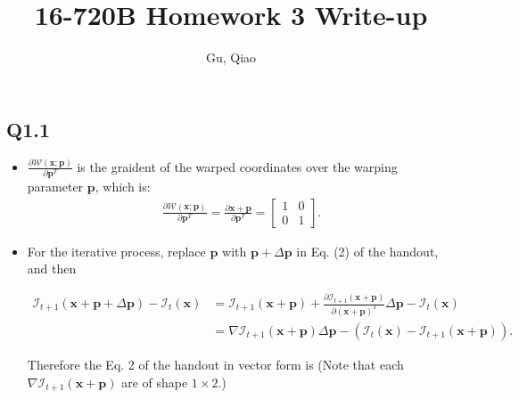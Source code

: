 \documentclass[11pt]{article}
\begin{document}
\author{Gu, Qiao}
\title{16-720B Homework 3 Write-up}
\maketitle

\medskip

\subsection*{Q1.1}

\newcommand{\W} {\mathcal{W}}
\newcommand{\I} {\mathcal{I}}
\newcommand{\B} {\mathcal{B}}
\newcommand{\w} {\mathbf{w}}
\newcommand{\x} {\mathbf{x}}
\newcommand{\p} {\mathbf{p}}
\newcommand{\A} {\mathbf{A}}

\begin{itemize}
  \item $\frac{\partial \W(\x; \p)} {\partial \p^T}$ is the graident of the warped coordinates over the warping parameter $\p$, which is:
  \begin{align} \label{warp_gradient_translation}
      \frac{\partial \W(\x; \p)} {\partial \p^T} =
      \frac{\partial \x + \p} {\partial \p^T} =
      \begin{bmatrix}
          1 & 0 \\
          0 & 1
      \end{bmatrix}.
  \end{align}

  \item For the iterative process, replace $\p$ with $\p+\Delta \p$ in Eq. (2) of the handout, and then

  \begin{align} \label{ls}
      \I_{t+1}(\x+\p+\Delta \p) - \I_t(\x)
      &= \I_{t+1} (\x + \p) + \frac{\partial \I_{t+1}(\x+\p)}{\partial(\x+\p)^T} \Delta \p - \I_t(\x) \\
      &= \nabla \I_{t+1}(\x+\p) \Delta \p - (\I_t(\x) - \I_{t+1} (\x+\p)).
  \end{align}

  Therefore the Eq. 2 of the handout in vector form is (Note that each $\nabla \I_{t+1}(\x+\p)$ are of shape $1\times2$.)


\end{itemize}
\end{document}
